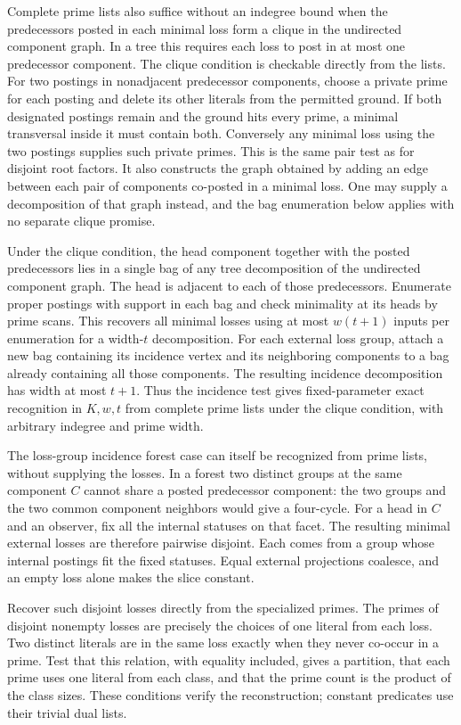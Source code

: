 Complete prime lists also suffice without an
indegree bound when the predecessors posted in
each minimal loss form a clique in the undirected
component graph. In a tree this requires each
loss to post in at most one predecessor component.
The clique condition is checkable directly from
the lists. For two postings in nonadjacent
predecessor components, choose a private prime
for each posting and delete its other literals
from the permitted ground. If both designated
postings remain and the ground hits every prime,
a minimal transversal inside it must contain
both. Conversely any minimal loss using the two
postings supplies such private primes. This is
the same pair test as for disjoint root factors.
It also constructs the graph obtained by adding
an edge between each pair of components co-posted
in a minimal loss. One may supply a decomposition
of that graph instead, and the bag enumeration
below applies with no separate clique promise.

Under the clique condition, the head component
together with the posted predecessors lies in a
single bag of any tree decomposition of the
undirected component graph. The head is adjacent
to each of those predecessors. Enumerate proper
postings with support in each bag and check
minimality at its heads by prime scans. This
recovers all minimal losses using at most
$w(t+1)$ inputs per enumeration for a width-$t$
decomposition. For each external loss group,
attach a new bag containing its incidence vertex
and its neighboring components to a bag already
containing all those components. The resulting
incidence decomposition has width at most $t+1$.
Thus the incidence test gives fixed-parameter
exact recognition in $K,w,t$ from complete prime
lists under the clique condition, with arbitrary
indegree and prime width.

The loss-group incidence forest case can itself
be recognized from prime lists, without supplying
the losses. In a forest two distinct groups at
the same component $C$ cannot share a posted
predecessor component: the two groups and the
two common component neighbors would give a
four-cycle. For a head in $C$ and an observer,
fix all the internal statuses on that facet.
The resulting minimal external losses are
therefore pairwise disjoint. Each comes from a
group whose internal postings fit the fixed
statuses. Equal external projections coalesce,
and an empty loss alone makes the slice constant.

Recover such disjoint losses directly from the
specialized primes. The primes of disjoint
nonempty losses are precisely the choices of
one literal from each loss. Two distinct literals
are in the same loss exactly when they never
co-occur in a prime. Test that this relation,
with equality included, gives a partition, that
each prime uses one literal from each class, and
that the prime count is the product of the class
sizes. These conditions verify the reconstruction;
constant predicates use their trivial dual lists.

